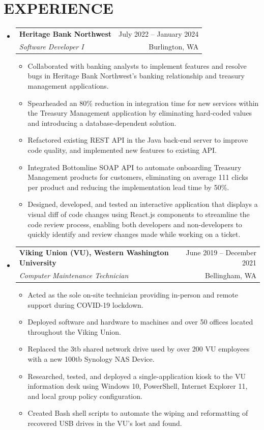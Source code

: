 \documentclass[letterpaper,11pt]{article}
\makeatletter
\newcommand{\resumeItem}[1]{
  \item\small{
    {#1 \vspace{-1pt}}
  }
}
\newcommand{\resumeSubheading}[4]{
  \vspace{-1pt}\item
    \begin{tabular*}{\textwidth}[t]{l@{\extracolsep{\fill}}r}
      \textbf{#1} & {\color{dark-grey}\small #2}\vspace{1pt}\\ %
      \textit{#3} & {\color{dark-grey} \small #4}\\ %
    \end{tabular*}\vspace{-4pt}
}
\newcommand{\resumeSubHeadingListStart}{\begin{itemize}[leftmargin=0in, label={}]}
\newcommand{\resumeSubHeadingListEnd}{\end{itemize}}
\newcommand{\resumeItemListStart}{\begin{itemize}}
\newcommand{\resumeItemListEnd}{\end{itemize}\vspace{0pt}}
\makeatother
\begin{document}
\section{EXPERIENCE}
  \resumeSubHeadingListStart

    \resumeSubheading
      {Heritage Bank Northwest}{July 2022 -- January 2024}
      {Software Developer I}{Burlington, WA}
     \resumeItemListStart
        \resumeItem{Collaborated with banking analysts to implement features and resolve bugs in Heritage Bank Northwest's banking relationship and treasury management applications.}
        \resumeItem{Spearheaded an 80\% reduction in integration time for new services within the Treasury Management application by eliminating hard-coded values and introducing a database-dependent solution.}
        \resumeItem{Refactored existing REST API in the Java back-end server to improve code quality, and implemented new features to existing API.}
        \resumeItem{Integrated Bottomline SOAP API to automate onboarding Treasury Management products for customers, eliminating on average 111 clicks per product and reducing the implementation lead time by 50\%.}
        \resumeItem{Designed, developed, and tested an interactive application that displays a visual diff of code changes using React.js components to streamline the code review process, enabling both developers and non-developers to quickly identify and review changes made while working on a ticket.}
     \resumeItemListEnd

    \resumeSubheading
      {Viking Union (VU), Western Washington University}{June 2019 -- December 2021}
      {Computer Maintenance Technician}{Bellingham, WA}
      \resumeItemListStart
        \resumeItem{Acted as the sole on-site technician providing in-person and remote support during COVID-19 lockdown.}
        \resumeItem{Deployed software and hardware to machines and over 50 offices located throughout the Viking Union.}
        \resumeItem{Replaced the 3tb shared network drive used by over 200 VU employees with a new 100tb Synology NAS Device.}
        \resumeItem{Researched, tested, and deployed a single-application kiosk to the VU information desk using Windows 10, PowerShell, Internet Explorer 11, and local group policy configuration.}
        \resumeItem{Created Bash shell scripts to automate the wiping and reformatting of recovered USB drives in the VU’s lost and found.}
      \resumeItemListEnd

  \resumeSubHeadingListEnd


\end{document}
